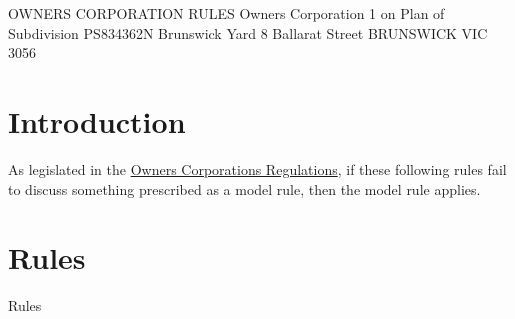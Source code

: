 \documentclass{article}
\begin{document}
OWNERS CORPORATION RULES Owners Corporation 1 on Plan of Subdivision PS834362N Brunswick Yard 8 Ballarat Street BRUNSWICK VIC 3056
\newpage

\section[intro]{Introduction}
As legislated in the \href{https://www.legislation.vic.gov.au/in-force/statutory-rules/owners-corporations-regulations-2018/002}{Owners Corporations Regulations}, if these following rules fail to discuss something prescribed as a model rule, then the model rule applies.

\newpage

\section[rules]{Rules}
Rules
\end{document}
